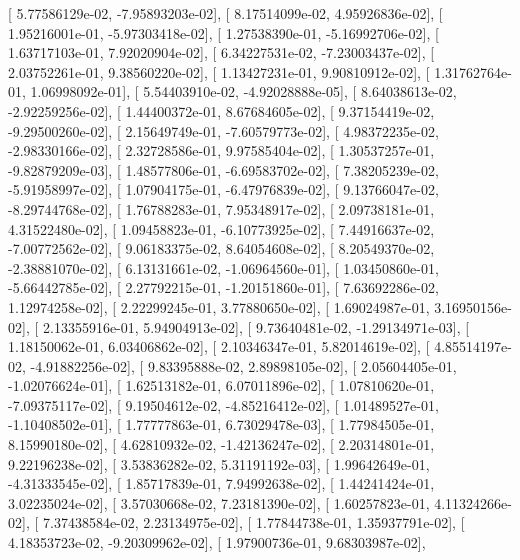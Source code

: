 \documentclass{article}
\begin{document}
       [  5.77586129e-02,  -7.95893203e-02],
       [  8.17514099e-02,   4.95926836e-02],
       [  1.95216001e-01,  -5.97303418e-02],
       [  1.27538390e-01,  -5.16992706e-02],
       [  1.63717103e-01,   7.92020904e-02],
       [  6.34227531e-02,  -7.23003437e-02],
       [  2.03752261e-01,   9.38560220e-02],
       [  1.13427231e-01,   9.90810912e-02],
       [  1.31762764e-01,   1.06998092e-01],
       [  5.54403910e-02,  -4.92028888e-05],
       [  8.64038613e-02,  -2.92259256e-02],
       [  1.44400372e-01,   8.67684605e-02],
       [  9.37154419e-02,  -9.29500260e-02],
       [  2.15649749e-01,  -7.60579773e-02],
       [  4.98372235e-02,  -2.98330166e-02],
       [  2.32728586e-01,   9.97585404e-02],
       [  1.30537257e-01,  -9.82879209e-03],
       [  1.48577806e-01,  -6.69583702e-02],
       [  7.38205239e-02,  -5.91958997e-02],
       [  1.07904175e-01,  -6.47976839e-02],
       [  9.13766047e-02,  -8.29744768e-02],
       [  1.76788283e-01,   7.95348917e-02],
       [  2.09738181e-01,   4.31522480e-02],
       [  1.09458823e-01,  -6.10773925e-02],
       [  7.44916637e-02,  -7.00772562e-02],
       [  9.06183375e-02,   8.64054608e-02],
       [  8.20549370e-02,  -2.38881070e-02],
       [  6.13131661e-02,  -1.06964560e-01],
       [  1.03450860e-01,  -5.66442785e-02],
       [  2.27792215e-01,  -1.20151860e-01],
       [  7.63692286e-02,   1.12974258e-02],
       [  2.22299245e-01,   3.77880650e-02],
       [  1.69024987e-01,   3.16950156e-02],
       [  2.13355916e-01,   5.94904913e-02],
       [  9.73640481e-02,  -1.29134971e-03],
       [  1.18150062e-01,   6.03406862e-02],
       [  2.10346347e-01,   5.82014619e-02],
       [  4.85514197e-02,  -4.91882256e-02],
       [  9.83395888e-02,   2.89898105e-02],
       [  2.05604405e-01,  -1.02076624e-01],
       [  1.62513182e-01,   6.07011896e-02],
       [  1.07810620e-01,  -7.09375117e-02],
       [  9.19504612e-02,  -4.85216412e-02],
       [  1.01489527e-01,  -1.10408502e-01],
       [  1.77777863e-01,   6.73029478e-03],
       [  1.77984505e-01,   8.15990180e-02],
       [  4.62810932e-02,  -1.42136247e-02],
       [  2.20314801e-01,   9.22196238e-02],
       [  3.53836282e-02,   5.31191192e-03],
       [  1.99642649e-01,  -4.31333545e-02],
       [  1.85717839e-01,   7.94992638e-02],
       [  1.44241424e-01,   3.02235024e-02],
       [  3.57030668e-02,   7.23181390e-02],
       [  1.60257823e-01,   4.11324266e-02],
       [  7.37438584e-02,   2.23134975e-02],
       [  1.77844738e-01,   1.35937791e-02],
       [  4.18353723e-02,  -9.20309962e-02],
       [  1.97900736e-01,   9.68303987e-02],
\end{document}
